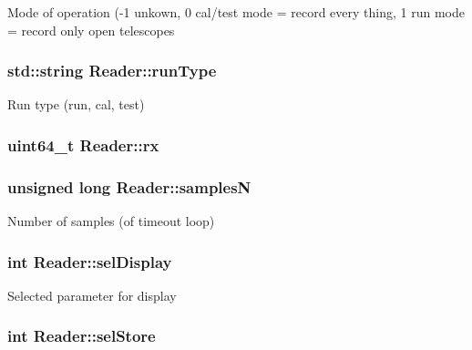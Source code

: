 Mode of operation (-\/1 unkown, 0 cal/test mode = record every thing, 1 run mode = record only open telescopes \hypertarget{classReader_a25348aba8ec875045f557beaa11e2415}{
\subsubsection[{run\-Type}]{\setlength{\rightskip}{0pt plus 5cm}std\-::string Reader\-::run\-Type\hspace{0.3cm}{\ttfamily [private]}}}\label{classReader_a25348aba8ec875045f557beaa11e2415}
Run type (run, cal, test) \hypertarget{classReader_a759fcd53649d1d49e66ff8e9cfd4b452}{
\subsubsection[{rx}]{\setlength{\rightskip}{0pt plus 5cm}uint64\-\_\-t Reader\-::rx\hspace{0.3cm}{\ttfamily [private]}}}\label{classReader_a759fcd53649d1d49e66ff8e9cfd4b452}
\hypertarget{classReader_aa6c9e0275ed3601e6df4fcb194d97834}{
\subsubsection[{samples\-N}]{\setlength{\rightskip}{0pt plus 5cm}unsigned long Reader\-::samples\-N\hspace{0.3cm}{\ttfamily [private]}}}\label{classReader_aa6c9e0275ed3601e6df4fcb194d97834}
Number of samples (of timeout loop) \hypertarget{classReader_ab52320900b9165867a7294a5282b2caf}{
\subsubsection[{sel\-Display}]{\setlength{\rightskip}{0pt plus 5cm}int Reader\-::sel\-Display\hspace{0.3cm}{\ttfamily [private]}}}\label{classReader_ab52320900b9165867a7294a5282b2caf}
Selected parameter for display \hypertarget{classReader_a298c2e5e5d77eab7642ebfef4ac8e8da}{
\subsubsection[{sel\-Store}]{\setlength{\rightskip}{0pt plus 5cm}int Reader\-::sel\-Store\hspace{0.3cm}{\ttfamily [private]}}}\label{classReader_a298c2e5e5d77eab7642ebfef4ac8e8da}
